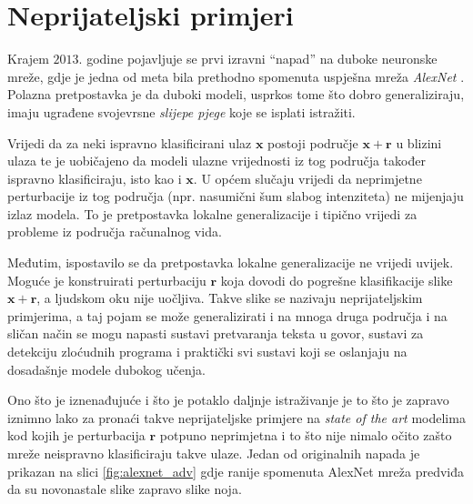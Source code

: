 \documentclass[utf8, diplomski]{fer}
\begin{document}
\section{Neprijateljski primjeri}
Krajem $2013.$ godine pojavljuje se prvi izravni ``napad'' na duboke neuronske mreže, gdje je jedna od meta bila prethodno spomenuta uspješna mreža \textit{AlexNet} \citep{Szegedy2014IntriguingPO}. Polazna pretpostavka je da duboki modeli, usprkos tome što dobro generaliziraju, imaju ugrađene svojevrsne \textit{slijepe pjege} koje se isplati istražiti.
\par
Vrijedi da za neki ispravno klasificirani ulaz $\boldsymbol{x}$ postoji područje $\boldsymbol{x} + \boldsymbol{r}$ u blizini ulaza te je uobičajeno da modeli ulazne vrijednosti iz tog područja također ispravno klasificiraju, isto kao i $\boldsymbol{x}$. U općem slučaju vrijedi da neprimjetne perturbacije iz tog područja (npr. nasumični šum slabog intenziteta) ne mijenjaju izlaz modela. To je pretpostavka lokalne generalizacije i tipično vrijedi za probleme iz područja računalnog vida.
\par
Međutim, ispostavilo se da pretpostavka lokalne generalizacije ne vrijedi uvijek. Moguće je konstruirati perturbaciju $\boldsymbol{r}$ koja dovodi do pogrešne klasifikacije slike $\boldsymbol{x} + \boldsymbol{r}$, a ljudskom oku nije uočljiva. Takve slike se nazivaju neprijateljskim primjerima, a taj pojam se može generalizirati i na mnoga druga područja i na sličan način se mogu napasti sustavi pretvaranja teksta u govor, sustavi za detekciju zloćudnih programa i praktički svi sustavi koji se oslanjaju na dosadašnje modele dubokog učenja. 
\par
Ono što je iznenađujuće i što je potaklo daljnje istraživanje je to što je zapravo iznimno lako za pronaći takve neprijateljske primjere na \textit{state of the art} modelima kod kojih je perturbacija $\boldsymbol{r}$ potpuno neprimjetna i to što nije nimalo očito zašto mreže neispravno klasificiraju takve ulaze. Jedan od originalnih napada je prikazan na slici \ref{fig:alexnet_adv} gdje ranije spomenuta AlexNet mreža predviđa da su novonastale slike zapravo slike noja.
\end{document}
